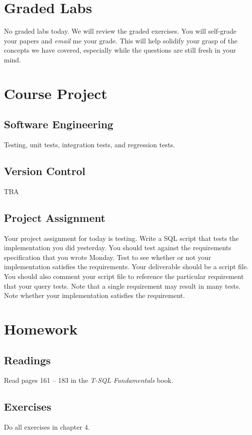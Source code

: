 \documentclass{article}
\begin{document}
    \section{Graded Labs}

    No graded labs today. We will review the graded exercises. You will self-grade your papers and \textit{email} me your grade. This will help solidify your grasp of the concepts we have covered, especially while the questions are still fresh in your mind.  

    \section{Course Project}


        \subsection{Software Engineering}

        Testing, unit tests, integration tests, and regression tests.
        
        \subsection{Version Control}

        TBA

        \subsection{Project Assignment}

        Your project assignment for today is testing. Write a SQL script that tests the implementation you did yesterday. You should test against the requirements specification that you wrote Monday. Test to see whether or not your implementation satisfies the requirements. Your deliverable should be a script file. You should also comment your script file to reference the particular requirement that your query tests. Note that a single requirement may result in many tests. Note whether your implementation satisfies the requirement. 

    \section{Homework}


        \subsection{Readings}

        Read pages 161 -- 183 in the \textit{T-SQL Fundamentals} book.
        
        \subsection{Exercises}

        Do all exercises in chapter 4.
\end{document}
